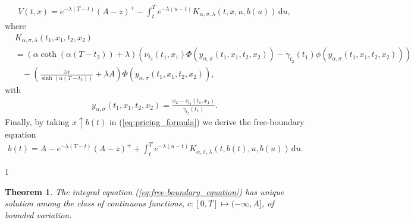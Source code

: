 \documentclass{tufte-handout}
\newtheorem{thm}{Theorem}
\def\uniqtheo{1}
\begin{document}
	\begin{align}\label{eq:pricing_formula}
		V(t, x) = e^{-\lambda (T - t)}(A - z)^+ - \int_{t}^{T}e^{-\lambda (u - t)}K_{\alpha, \sigma, \lambda}(t, x, u, b(u))\,\mathrm{d}u,
	\end{align}
	where
	\begin{align}\label{eq:kernel}
		&K_{\alpha, \sigma, \lambda}(t_1, x_1, t_2, x_2) \nonumber \\
		&=\left(\alpha\coth(\alpha(T - t_2)) + \lambda\right)\left(\nu_{t_2}(t_1, x_1)\Phi\left(y_{\alpha, \sigma}(t_1, x_1, t_2, x_2)\right) - \gamma_{t_2}(t_1)\phi(y_{\alpha, \sigma}(t_1, x_1, t_2, x_2))\right) \nonumber \\
		&\ \ \ \ - \left(\frac{z\alpha}{\sinh(\alpha(T - t_2))} + \lambda A\right)\Phi\left(y_{\alpha, \sigma}(t_1, x_1, t_2, x_2)\right),
	\end{align}
	with
	\begin{align*}
		y_{\alpha, \sigma}(t_1, x_1, t_2, x_2) = \frac{x_2 - \nu_{t_2}(t_1, x_1)}{\gamma_{t_2}(t_1)}.
	\end{align*}
	Finally, by taking $x \uparrow b(t)$ in (\ref{eq:pricing_formula}) we derive the free-boundary equation
	\begin{align}\label{eq:free-boundary_equation}
		b(t) = A - e^{-\lambda (T - t)}(A - z)^+ + \int_{t}^{T}e^{-\lambda (u - t)}K_{\alpha, \sigma, \lambda}(t, b(t), u, b(u))\,\mathrm{d}u.
	\end{align}
	
	\if\uniqtheo1
	\begin{thm}
		The integral equation (\ref{eq:free-boundary_equation}) has unique solution among the class of continuous functions, $c:[0, T]\mapsto (-\infty, A]$, of bounded variation.
	\end{thm}
\end{document}
